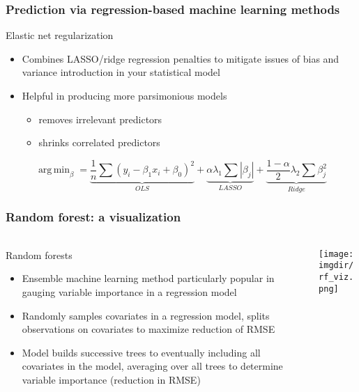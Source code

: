 \documentclass[aspectratio=169, t, 10pt]{beamer}
\DeclareMathOperator*{\argmin}{arg\,min}
\begin{document}
\begin{frame}
  \frametitle{Prediction via regression-based machine learning methods}
  \begin{block}{Elastic net regularization}\citep{zouhastie_2005}
    \begin{itemize}
    \item Combines LASSO/ridge regression penalties to mitigate issues
      of bias and variance introduction in your statistical model
    \item Helpful in producing more parsimonious models
      \begin{itemize}
      \item removes irrelevant predictors
      \item shrinks correlated predictors
      \end{itemize}
    \end{itemize}
  \end{block}
  \begin{block}{}
    \begin{equation}
      \argmin_{\beta} = \underbrace{\frac{1}{n}\sum (y_i - \beta_1 x_i
        + \beta_0)^2}_{OLS} + \underbrace{\alpha\lambda_1\sum
      |\beta_j|}_{LASSO} + \underbrace{\frac{1-\alpha}{2}\lambda_2\sum \beta_j^2}_{Ridge} \nonumber
    \end{equation}
  \end{block}
\end{frame}
      
\begin{frame}
  \frametitle{Random forest: a visualization}
  \framesubtitle{\citep{koehrsen_2018}}
  \begin{columns}[T]
    \begin{column}{.5\linewidth}
      \begin{block}{Random forests}
        \begin{itemize}
        \item Ensemble machine learning method particularly popular in
          gauging variable importance in a regression model
        \item Randomly samples covariates in a regression model, splits
          observations on covariates to maximize reduction of RMSE 
        \item Model builds successive trees to eventually including all
          covariates in the model, averaging over all trees to determine
          variable importance (reduction in RMSE)
        \end{itemize}
      \end{block}
    \end{column}
    \begin{column}{.5\linewidth}
      \texttt{[image: \\imgdir/rf\_viz.png]}
    \end{column}
  \end{columns}
\end{frame}
\end{document}
